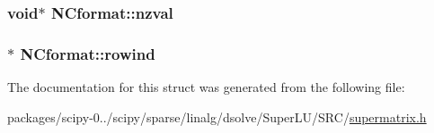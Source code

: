 \subsubsection[{nzval}]{\setlength{\rightskip}{0pt plus 5cm}void$\ast$ N\+Cformat\+::nzval}\label{structNCformat_aa3e85810bb190b7359d8aaa956a64e64}
\hypertarget{structNCformat_a16eb8492bb5694035ef3e620ea8c77b1}{}
\subsubsection[{rowind}]{$\ast$ N\+Cformat\+::rowind}\label{structNCformat_a16eb8492bb5694035ef3e620ea8c77b1}


The documentation for this struct was generated from the following file\+:\begin{DoxyCompactItemize}
\item 
packages/scipy-\/0../scipy/sparse/linalg/dsolve/\+Super\+L\+U/\+S\+R\+C/\hyperlink{supermatrix_8h}{supermatrix.\+h}\end{DoxyCompactItemize}
